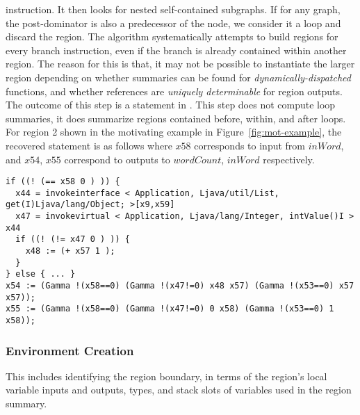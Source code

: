 instruction.
%
It then looks for nested self-contained subgraphs.
%
If for any graph, the post-dominator is also a predecessor of the node, we consider it a loop and discard the region.
%
The algorithm systematically attempts to build regions for every branch instruction, even if the branch is already
contained within another region.
%
The reason for this is that, it may not be possible to instantiate the larger region depending on whether summaries can be found
for {\em dynamically-dispatched} functions, and whether references are {\em uniquely determinable} for region outputs.
%
The outcome of this step is a statement in \tool.
%
This step does not compute loop summaries, it does summarize regions contained before, within, and after loops.
%
For region 2 shown in the motivating example in Figure~\ref{fig:mot-example}, the recovered statement is as follows where
$x58$ corresponds to input from $inWord$, and $x54$, $x55$ correspond to outputs to $wordCount$,
$inWord$ respectively.\\
%
\begin{lstlisting}[numbers=none]
if ((! (== x58 0 ) )) {
  x44 = invokeinterface < Application, Ljava/util/List, get(I)Ljava/lang/Object; >[x9,x59]
  x47 = invokevirtual < Application, Ljava/lang/Integer, intValue()I > x44
  if ((! (!= x47 0 ) )) {
    x48 := (+ x57 1 );
  }
} else { ... }
x54 := (Gamma !(x58==0) (Gamma !(x47!=0) x48 x57) (Gamma !(x53==0) x57 x57));
x55 := (Gamma !(x58==0) (Gamma !(x47!=0) 0 x58) (Gamma !(x53==0) 1 x58));

\end{lstlisting}
\subsubsection{Environment Creation}

%
This includes identifying the region boundary, in terms of the region\rq s local variable inputs and outputs, types, and stack
slots of variables used in the region summary.
%
%
%

%

